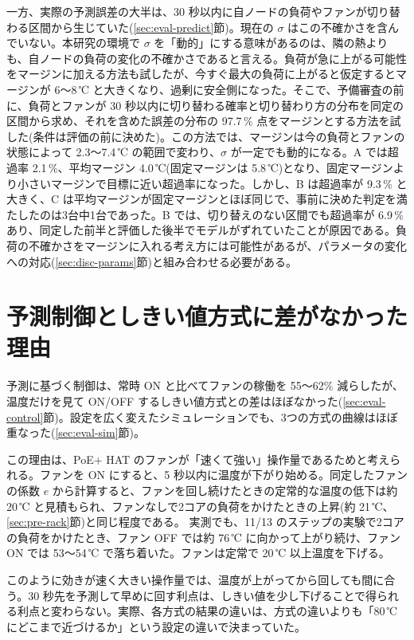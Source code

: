 一方、実際の予測誤差の大半は、30 秒以内に自ノードの負荷やファンが切り替わる区間から生じていた(\ref{sec:eval-predict}節)。現在の $\sigma$ はこの不確かさを含んでいない。本研究の環境で $\sigma$ を「動的」にする意味があるのは、隣の熱よりも、自ノードの負荷の変化の不確かさであると言える。負荷が急に上がる可能性をマージンに加える方法も試したが、今すぐ最大の負荷に上がると仮定するとマージンが 6〜8\,℃ と大きくなり、過剰に安全側になった。そこで、予備審査の前に、負荷とファンが 30 秒以内に切り替わる確率と切り替わり方の分布を同定の区間から求め、それを含めた誤差の分布の 97.7\,\% 点をマージンとする方法を試した(条件は評価の前に決めた)。この方法では、マージンは今の負荷とファンの状態によって 2.3〜7.4\,℃ の範囲で変わり、$\sigma$ が一定でも動的になる。A では超過率 2.1\,\%、平均マージン 4.0\,℃(固定マージンは 5.8\,℃)となり、固定マージンより小さいマージンで目標に近い超過率になった。しかし、B は超過率が 9.3\,\% と大きく、C は平均マージンが固定マージンとほぼ同じで、事前に決めた判定を満たしたのは3台中1台であった。B では、切り替えのない区間でも超過率が 6.9\,\% あり、同定した前半と評価した後半でモデルがずれていたことが原因である。負荷の不確かさをマージンに入れる考え方には可能性があるが、パラメータの変化への対応(\ref{sec:disc-params}節)と組み合わせる必要がある。

\section{予測制御としきい値方式に差がなかった理由}\label{sec:disc-fan}
予測に基づく制御は、常時 ON と比べてファンの稼働を 55〜62\% 減らしたが、温度だけを見て ON/OFF するしきい値方式との差はほぼなかった(\ref{sec:eval-control}節)。設定を広く変えたシミュレーションでも、3つの方式の曲線はほぼ重なった(\ref{sec:eval-sim}節)。

この理由は、PoE+ HAT のファンが「速くて強い」操作量であるためと考えられる。ファンを ON にすると、5 秒以内に温度が下がり始める。同定したファンの係数 $e$ から計算すると、ファンを回し続けたときの定常的な温度の低下は約 20\,℃ と見積もられ、ファンなしで2コアの負荷をかけたときの上昇(約 21\,℃、\ref{sec:pre-rack}節)と同じ程度である。
実測でも、11/13 のステップの実験で2コアの負荷をかけたとき、ファン OFF では約 76\,℃ に向かって上がり続け、ファン ON では 53〜54\,℃ で落ち着いた。ファンは定常で 20\,℃ 以上温度を下げる。

このように効きが速く大きい操作量では、温度が上がってから回しても間に合う。30 秒先を予測して早めに回す利点は、しきい値を少し下げることで得られる利点と変わらない。実際、各方式の結果の違いは、方式の違いよりも「80\,℃ にどこまで近づけるか」という設定の違いで決まっていた。

